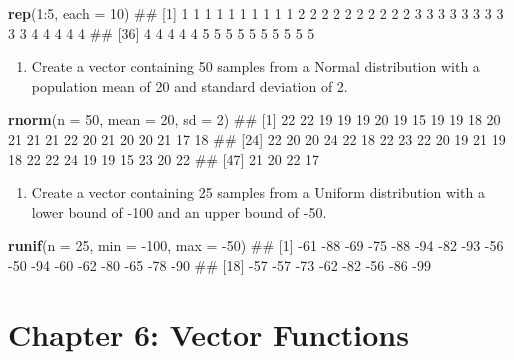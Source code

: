 \documentclass[]{book}
\newenvironment{Shaded}{\begin{snugshade}}{\end{snugshade}}
\newcommand{\KeywordTok}[1]{\textcolor[rgb]{0.13,0.29,0.53}{\textbf{{#1}}}}
\newcommand{\DataTypeTok}[1]{\textcolor[rgb]{0.13,0.29,0.53}{{#1}}}
\newcommand{\DecValTok}[1]{\textcolor[rgb]{0.00,0.00,0.81}{{#1}}}
\newcommand{\NormalTok}[1]{{#1}}
\providecommand{\tightlist}{%
  \setlength{\itemsep}{0pt}\setlength{\parskip}{0pt}}
\theoremstyle{definition}
\theoremstyle{definition}
\theoremstyle{remark}
\begin{document}
\begin{Shaded}
\begin{Highlighting}[]
\KeywordTok{rep}\NormalTok{(}\DecValTok{1}\NormalTok{:}\DecValTok{5}\NormalTok{, }\DataTypeTok{each =} \DecValTok{10}\NormalTok{)}
\NormalTok{##  [1] 1 1 1 1 1 1 1 1 1 1 2 2 2 2 2 2 2 2 2 2 3 3 3 3 3 3 3 3 3 3 4 4 4 4 4}
\NormalTok{## [36] 4 4 4 4 4 5 5 5 5 5 5 5 5 5 5}
\end{Highlighting}
\end{Shaded}

\begin{enumerate}
\def\labelenumi{\arabic{enumi}.}
\setcounter{enumi}{7}
\tightlist
\item
  Create a vector containing 50 samples from a Normal distribution with
  a population mean of 20 and standard deviation of 2.
\end{enumerate}

\begin{Shaded}
\begin{Highlighting}[]
\KeywordTok{rnorm}\NormalTok{(}\DataTypeTok{n =} \DecValTok{50}\NormalTok{, }\DataTypeTok{mean =} \DecValTok{20}\NormalTok{, }\DataTypeTok{sd =} \DecValTok{2}\NormalTok{)}
\NormalTok{##  [1] 22 22 19 19 19 20 19 15 19 19 18 20 21 21 21 22 20 21 20 20 21 17 18}
\NormalTok{## [24] 22 20 20 24 22 18 22 23 22 20 19 21 19 18 22 22 24 19 19 15 23 20 22}
\NormalTok{## [47] 21 20 22 17}
\end{Highlighting}
\end{Shaded}

\begin{enumerate}
\def\labelenumi{\arabic{enumi}.}
\setcounter{enumi}{8}
\tightlist
\item
  Create a vector containing 25 samples from a Uniform distribution with
  a lower bound of -100 and an upper bound of -50.
\end{enumerate}

\begin{Shaded}
\begin{Highlighting}[]
\KeywordTok{runif}\NormalTok{(}\DataTypeTok{n =} \DecValTok{25}\NormalTok{, }\DataTypeTok{min =} \NormalTok{-}\DecValTok{100}\NormalTok{, }\DataTypeTok{max =} \NormalTok{-}\DecValTok{50}\NormalTok{)}
\NormalTok{##  [1] -61 -88 -69 -75 -88 -94 -82 -93 -56 -50 -94 -60 -62 -80 -65 -78 -90}
\NormalTok{## [18] -57 -57 -73 -62 -82 -56 -86 -99}
\end{Highlighting}
\end{Shaded}

\section{Chapter 6: Vector Functions}\label{chapter-6-vector-functions}
\end{document}
